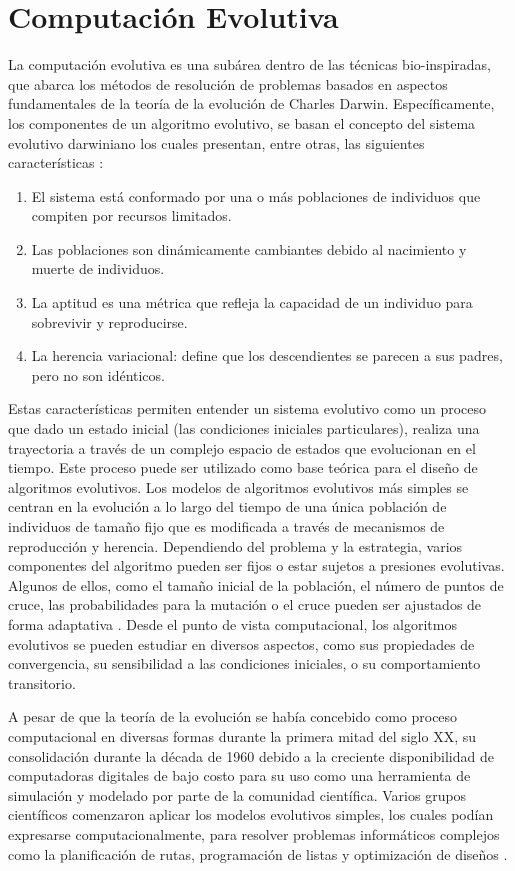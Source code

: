 
\chapter{Computación Evolutiva} 
\label{Chapter4} 
La computación evolutiva es una subárea dentro de las técnicas bio-inspiradas, que abarca los métodos de resolución de problemas basados en aspectos fundamentales de la teoría de la evolución de Charles Darwin. Específicamente, los componentes de un algoritmo evolutivo, se basan el concepto del sistema evolutivo darwiniano los cuales presentan, entre otras, las siguientes características \cite{de2006evolutionary}:
\begin{enumerate}
\item El sistema está conformado por una o más poblaciones de individuos que compiten por recursos limitados.
\item Las poblaciones son dinámicamente cambiantes debido al nacimiento y muerte de individuos.
\item La aptitud es una métrica que refleja la capacidad de un individuo para sobrevivir y reproducirse.
\item La herencia variacional: define que los descendientes se parecen a sus padres, pero no son idénticos.
\end{enumerate}
Estas características  permiten entender un sistema evolutivo como un proceso que dado un estado inicial (las condiciones iniciales particulares), realiza una trayectoria a través de un complejo espacio de estados que evolucionan en el tiempo. Este proceso puede ser utilizado como base teórica para el diseño de algoritmos evolutivos. Los modelos de algoritmos evolutivos más simples se centran en la evolución a lo largo del tiempo de una única población de individuos de tamaño fijo que es modificada a través de  mecanismos de reproducción y herencia. Dependiendo del problema y la estrategia, varios componentes  del algoritmo pueden ser fijos o estar sujetos a presiones evolutivas. Algunos de ellos, como el tamaño inicial de la población, el número de puntos de cruce, las probabilidades para la mutación o el cruce pueden ser ajustados de forma adaptativa \cite{angeline1995adaptive}. Desde el punto de vista computacional, los algoritmos evolutivos se pueden estudiar en diversos aspectos, como sus propiedades de convergencia, su sensibilidad a las condiciones iniciales, o su comportamiento transitorio. 

A pesar de que la teoría de la evolución se había concebido como proceso computacional en diversas formas durante la primera mitad del siglo XX, su consolidación durante la década de 1960 debido a la creciente disponibilidad de computadoras digitales de bajo costo para su uso como una herramienta de simulación y modelado por parte de la comunidad científica. Varios grupos científicos comenzaron aplicar los modelos evolutivos simples, los cuales podían expresarse computacionalmente, para resolver problemas informáticos complejos como la planificación de rutas, programación de listas y optimización de diseños \cite{holland1992adaptation}\cite{weise2009global}. 

